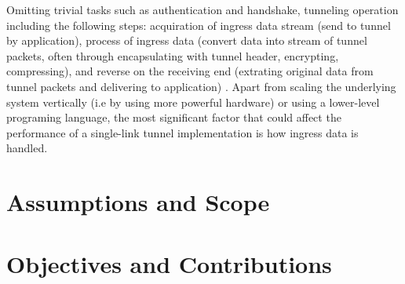Omitting trivial tasks such as authentication and handshake, tunneling operation including the following steps: acquiration of ingress data stream (send to tunnel by application), process of ingress data (convert data into stream of tunnel packets, often through encapsulating with tunnel header, encrypting, compressing), and reverse on the receiving end (extrating original data from tunnel packets and delivering to application) .
Apart from scaling the underlying system vertically (i.e by using more powerful hardware) or using a lower-level programing language, the most significant factor that could affect the performance of a single-link tunnel implementation is how ingress data is handled.







\section{Assumptions and Scope}




\section{Objectives and Contributions}



